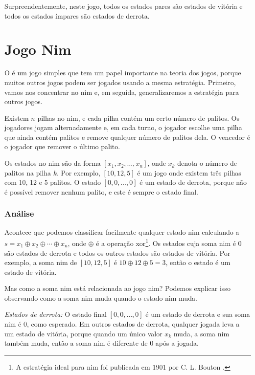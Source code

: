 Surpreendentemente, neste jogo, todos os estados pares são estados de vitória e todos os estados ímpares são estados de derrota.

\section{Jogo Nim}


O  é um jogo simples que tem um papel importante na teoria dos jogos, porque muitos outros jogos podem ser jogados usando a mesma estratégia. Primeiro, vamos nos concentrar no nim e, em seguida, generalizaremos a estratégia para outros jogos.

Existem $n$ pilhas no nim, e cada pilha contém um certo número de palitos. Os jogadores jogam alternadamente e, em cada turno, o jogador escolhe uma pilha que ainda contém palitos e remove qualquer número de palitos dela. O vencedor é o jogador que remover o último palito.

Os estados no nim são da forma $[x_1,x_2,\ldots,x_n]$, onde $x_k$ denota o número de palitos na pilha $k$. Por exemplo, $[10,12,5]$ é um jogo onde existem três pilhas com 10, 12 e 5 palitos. O estado $[0,0,\ldots,0]$ é um estado de derrota, porque não é possível remover nenhum palito, e este é sempre o estado final.

\subsubsection{Análise}

Acontece que podemos classificar facilmente qualquer estado nim calculando a  $s = x_1 \oplus x_2 \oplus \cdots \oplus x_n$, onde $\oplus$ é a operação xor\footnote{A estratégia ideal para nim foi publicada em 1901 por C. L. Bouton \cite{bou01}.}. Os estados cuja soma nim é 0 são estados de derrota e todos os outros estados são estados de vitória. Por exemplo, a soma nim de $[10,12,5]$ é $10 \oplus 12 \oplus 5 = 3$, então o estado é um estado de vitória.

Mas como a soma nim está relacionada ao jogo nim? Podemos explicar isso observando como a soma nim muda quando o estado nim muda.

\textit{Estados de derrota:} O estado final $[0,0,\ldots,0]$ é um estado de derrota e sua soma nim é 0, como esperado. Em outros estados de derrota, qualquer jogada leva a um estado de vitória, porque quando um único valor $x_k$ muda, a soma nim também muda, então a soma nim é diferente de 0 após a jogada.

